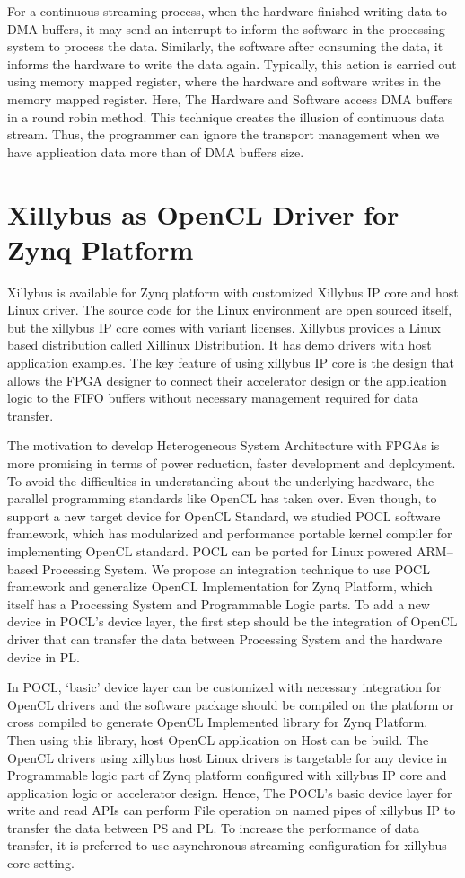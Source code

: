 For a continuous streaming process, when the hardware finished writing data to DMA buffers, it may send an interrupt to inform the software in the processing system to process the data. Similarly, the software after consuming the data, it informs the hardware to write the data again. Typically, this action is carried out using memory mapped register, where the hardware and software writes in the memory mapped register. Here, The Hardware and Software access DMA buffers in a round robin method. This technique creates the illusion of continuous data stream. Thus, the programmer can ignore the transport management when we have application data more than of DMA buffers size. 

\section{Xillybus as OpenCL Driver for Zynq Platform}
Xillybus is available for Zynq platform with customized Xillybus IP core and host Linux driver. The source code for the Linux environment are open sourced itself, but the xillybus IP core comes with variant licenses. Xillybus provides a Linux based distribution called Xillinux Distribution. It has demo drivers with host application examples. The key feature of using xillybus IP core is the design that allows the FPGA designer to connect their accelerator design or the application logic to the FIFO buffers without necessary management required for data transfer.

The motivation to develop Heterogeneous System Architecture with FPGAs is more promising in terms of power reduction, faster development and deployment. To avoid the difficulties in understanding about the underlying hardware, the parallel programming standards like OpenCL has taken over. Even though, to support a new target device for OpenCL Standard, we studied POCL software framework, which has modularized and performance portable kernel compiler for implementing OpenCL standard. POCL can be ported for Linux powered ARM--based Processing System. We propose an integration technique to use POCL framework and generalize OpenCL Implementation for Zynq Platform, which itself has a Processing System and Programmable Logic parts. To add a new device in POCL’s device layer, the first step should be the integration of OpenCL driver that can transfer the data between Processing System and the hardware device in PL. 

In POCL, ‘basic’ device layer can be customized with necessary integration for OpenCL drivers and the software package should be compiled on the platform or cross compiled to generate OpenCL Implemented library for Zynq Platform. Then using this library, host OpenCL application on Host can be build. The OpenCL drivers using xillybus host Linux drivers is targetable for any device in Programmable logic part of Zynq platform configured with xillybus IP core and application logic or accelerator design. Hence, The POCL’s basic device layer for write and read APIs can perform File operation on named pipes of xillybus IP to transfer the data between PS and PL. To increase the performance of data transfer, it is preferred to use asynchronous streaming configuration for xillybus core setting.

